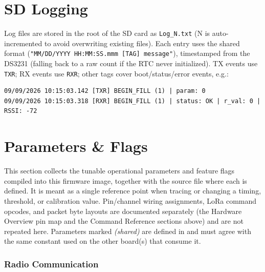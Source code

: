 ﻿\documentclass[11pt,letterpaper]{article}
\begin{document}
\section{SD Logging}

Log files are stored in the root of the SD card as \texttt{Log\_N.txt}
(N is auto-incremented to avoid overwriting existing files).
Each entry uses the shared  format
(\texttt{"MM/DD/YYYY HH:MM:SS.mmm [TAG] message"}), timestamped from the
DS3231 (falling back to a raw  count if the RTC never
initialized). TX events use \texttt{TXR}; RX events use \texttt{RXR};
other tags cover boot/status/error events, e.g.:
\begin{lstlisting}[language={},numbers=none]
09/09/2026 10:15:03.142 [TXR] BEGIN_FILL (1) | param: 0
09/09/2026 10:15:03.318 [RXR] BEGIN_FILL (1) | status: OK | r_val: 0 | RSSI: -72
\end{lstlisting}

\section{Parameters \& Flags}

This section collects the tunable operational parameters and feature flags
compiled into this firmware image, together with the source file where each
is defined. It is meant as a single reference point when tracing or changing
a timing, threshold, or calibration value. Pin/channel wiring assignments,
LoRa command opcodes, and packet byte layouts are documented separately (the
Hardware Overview pin map and the Command Reference sections above) and are
not repeated here. Parameters marked \emph{(shared)} are defined in
 and must agree with the same constant used on
the other board(s) that consume it.

\subsubsection*{Radio Communication}
\end{document}
